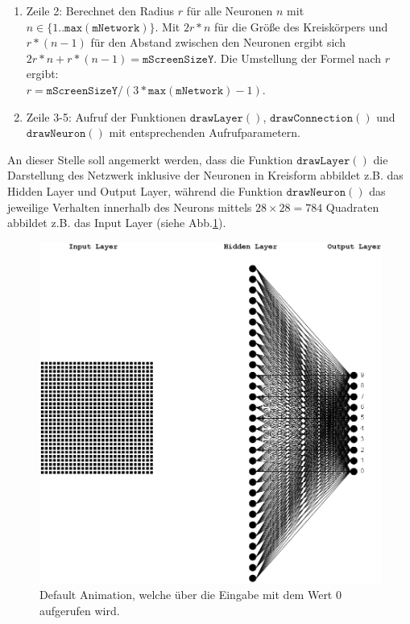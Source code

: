 \begin{enumerate}
	\item Zeile 2: Berechnet den Radius $r$ für alle Neuronen $n$ mit $n \in \{1..\mathtt{max(mNetwork)}\}$. Mit $2r*n$ für die Größe des Kreiskörpers und $r*(n-1)$ für den Abstand zwischen den Neuronen ergibt sich $2r*n+r*(n-1) = \mathtt{mScreenSizeY}$. Die Umstellung der Formel nach $r$ ergibt: \\[0.2cm]
\hspace*{1.3cm} $r = \mathtt{mScreenSizeY}/(3*\mathtt{max(mNetwork)}-1)$.
	\item Zeile 3-5: Aufruf der Funktionen $\mathtt{drawLayer()}$, $\mathtt{drawConnection()}$ und $\mathtt{drawNeuron()}$ mit entsprechenden Aufrufparametern. 
\end{enumerate}
An dieser Stelle soll angemerkt werden, dass die Funktion $\mathtt{drawLayer()}$ die Darstellung des Netzwerk inklusive der Neuronen in Kreisform abbildet z.B. das Hidden Layer und Output Layer, während die Funktion $\mathtt{drawNeuron()}$ das jeweilige Verhalten innerhalb des Neurons mittels $28 \times 28=784$ Quadraten abbildet z.B. das Input Layer (siehe Abb.\ref{fig:animation_network_default}). \\

\begin{figure}[hbt]
	\centering
	\includegraphics[scale=0.7]{Bilder/animation_network_default}
	\caption{Default Animation, welche über die Eingabe mit dem Wert $0$ aufgerufen wird.} 
	\label{fig:animation_network_default} 
\end{figure}

